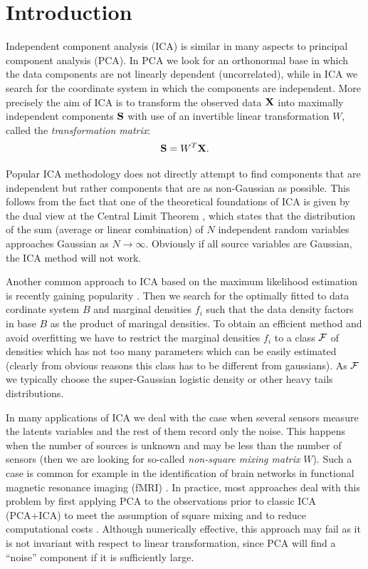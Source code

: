 \section{Introduction}
\label{introduction}

Independent component analysis (ICA) is similar in many aspects to principal component analysis (PCA). In PCA we look for an orthonormal base in which the data components are not
linearly dependent (uncorrelated), while in 
ICA we search for the coordinate system in which the components are independent. More precisely the aim of ICA is to transform the observed data $\X$ into maximally independent components $\S$ with use of an invertible linear transformation $W$, called the {\em transformation matrix}: $$
\S = W^T \X.
$$

Popular ICA methodology does not directly attempt to find components that are independent but rather components that are as non-Gaussian as possible.
This follows from the fact that one of the theoretical foundations of ICA is given by the dual view at the Central Limit Theorem \cite{hyvarinen2000independent}, which states that the distribution of the sum (average or linear combination) of $N$ independent random variables approaches Gaussian as  $N\rightarrow \infty$. Obviously if all source variables are Gaussian, the ICA method will not work. 

Another common approach to ICA based on the maximum likelihood estimation~\cite{pham1997blind} is recently gaining popularity \cite{hyvarinen2004independent,samworth2012independent,ICA2017pattern}.  Then we search for the optimally fitted to data cordinate system $B$ and marginal
densities $f_i$ such that the data density factors in base $B$ as the product of maringal densities. To obtain an efficient method and avoid 
overfitting we have to restrict the marginal densities $f_i$ to a class $\F$ of densities which has not too many parameters which can be easily estimated (clearly from obvious reasons this class has to be different from gaussians).  As $\F$ we typically choose the super-Gaussian logistic density or other heavy tails distributions.

In many applications of ICA we deal with the case when several sensors measure the latents variables and the rest of them record only the noise. This happens when the number of sources is unknown and may be less than the number of sensors (then we are looking for so-called {\em non-square mixing matrix} $W$).
Such a case is common for example in the identification of brain networks
in functional  magnetic resonance imaging (fMRI) 
\cite{beckmann2012modelling,green2002pca}.
In practice, most approaches deal with this problem by first applying PCA to the observations prior to classic ICA (PCA+ICA) to meet the assumption of square mixing and to reduce computational costs \cite{hyvarinen2004independent}. Although numerically effective, this approach may fail as it is not invariant with respect to linear transformation, since PCA will find a ``noise'' component if
it is sufficiently large. 

